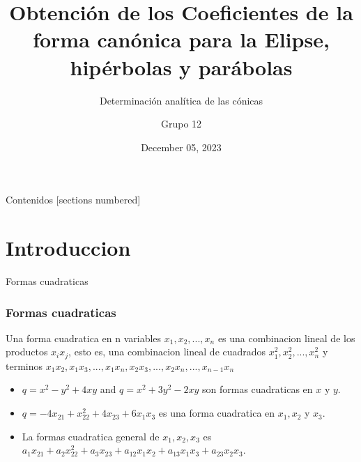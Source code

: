 \documentclass[xcolor={dvipsnames},aspectratio=169,10pt]{beamer}
\title{Obtención de los Coeficientes de la forma canónica para la Elipse, hipérbolas y parábolas}
\subtitle{Determinación analítica de las cónicas}
\author{Grupo 12}
\date{December 05, 2023}
\begin{document}
\maketitle%

\begin{frame}{Contenidos}
  [sections numbered]
  \tableofcontents[hideallsubsections]
\end{frame}

\section{Introduccion}

\begin{frame}{Formas cuadraticas}
    \frametitle{Formas cuadraticas}
    \begin{definition}
      Una forma cuadratica en n variables $x_{1}, x_{2}, . . . , x_{n}$ es una combinacion lineal de los
      productos $x_{i} x_{j}$, esto es, una combinacion lineal de cuadrados $x_{1}^2 , x_{2}^2 , . . . , x_{n}^2$ y
      terminos $x_{1}x_{2}, x_{1}x_{3}, . . . , x_{1}x_{n}, x_{2}x_{3}, . . . , x_{2}x_{n}, . . . , x_{n-1}x_{n}$
    \end{definition}

  \begin{example}
    \begin{itemize}
        \item $q = x^2 - y^2 + 4xy$ and $q = x^2 + 3y^2 - 2xy$ son formas cuadraticas en $x$ y $y$.
        \item $q = -4x_{21} + x_{22}^2 + 4x_{23} + 6x_{1}x_{3}$ es una forma cuadratica en $x_{1}, x_{2}$ y $x_{3}$.
        \item La formas cuadratica general de $x_{1}, x_{2}, x_{3}$ es $a_{1}x_{21} + a_{2}x_{22}^2 + a_{3}x_{23} + a_{12}x_{1}x_{2} + a_{13}x_{1}x_{3} + a_{23}x_{2}x_{3}$.
    \end{itemize}
  \end{example}
\end{frame}
\end{document}
